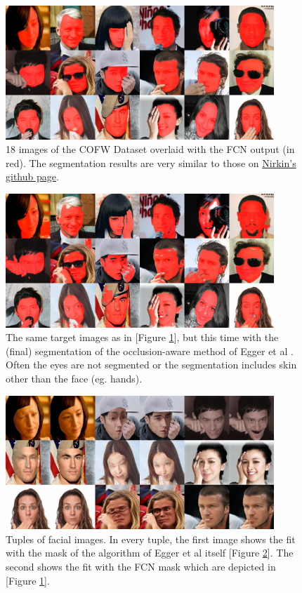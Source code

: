 \begin{figure}[H]
	\centering
	\includegraphics[width=0.9\textwidth]{Figures/chap2/myMatrix.jpg}
	\caption{18 images of the COFW Dataset overlaid with the FCN output (in red). The segmentation results are very similar to those on \href{https://github.com/YuvalNirkin/face_segmentation}{Nirkin's github page}.}
	\label{fig:chap2:myMatrix}
\end{figure}

\begin{figure}[H]
	\centering
	\includegraphics[width=0.9\textwidth]{Figures/chap2/myMatrix_EGGER.jpg}
	\caption{The same target images as in [Figure \ref{fig:chap2:myMatrix}], but this time with the (final) segmentation of the occlusion-aware method of Egger et al \cite{egger_paper}. Often the eyes are not segmented or the segmentation includes skin other than the face (eg. hands).}
	\label{fig:chap2:myMatrix_EGGER}
\end{figure}

\begin{figure}[H]
	\centering
	\includegraphics[width=0.9\textwidth]{Figures/chap2/COFW_Fits.png}
	\caption{Tuples of facial images. In every tuple, the first image shows the fit with the mask of the algorithm of Egger et al itself [Figure \ref{fig:chap2:myMatrix_EGGER}]. The second shows the fit with the FCN mask which are depicted in [Figure \ref{fig:chap2:myMatrix}].}
	\label{fig:chap2:COFW_Fits}
\end{figure}


